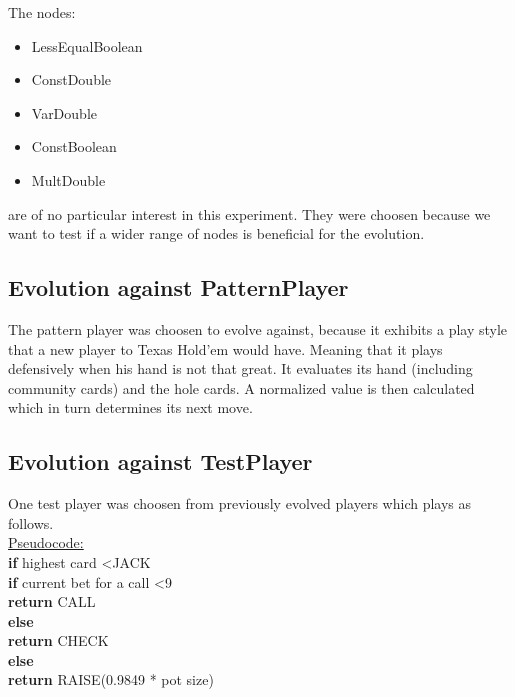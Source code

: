 \documentclass[12pt,fleqn,a4paper]{article}
\begin{document}
The nodes:
\begin{itemize}
	\item LessEqualBoolean
	\item ConstDouble
	\item VarDouble
	\item ConstBoolean
	\item MultDouble 
\end{itemize}
are of no particular interest in this experiment. They were choosen because we want to test if a wider range of nodes is beneficial for the evolution.

\subsection{Evolution against PatternPlayer}
\label{ssec:patternplayer}
The pattern player was choosen to evolve against, because it exhibits a play style that a new player to Texas Hold'em would have. Meaning that it plays defensively when his hand is not that great. It evaluates its hand (including community cards) and the hole cards. A normalized value is then calculated which in turn determines its next move.

\newpage

\subsection{Evolution against TestPlayer}
\label{ssec:testplayer}
One test player was choosen from previously evolved players which plays as follows.\\

\underline{Pseudocode:}\\

\textbf{if} highest card \textless \hspace*{0.5em}JACK \\
\hspace*{3em}\textbf{if} current bet for a call \textless \hspace*{0.5em}9 \\
\hspace*{3.9em} \textbf{return} CALL \\
\hspace*{2.5em} \textbf{else} \\
\hspace*{3.9em} \textbf{return} CHECK \\
\hspace*{1.5em} \textbf{else}  \\
\hspace*{3em} \textbf{return} RAISE(0.9849 * pot size) \\
\end{document}
